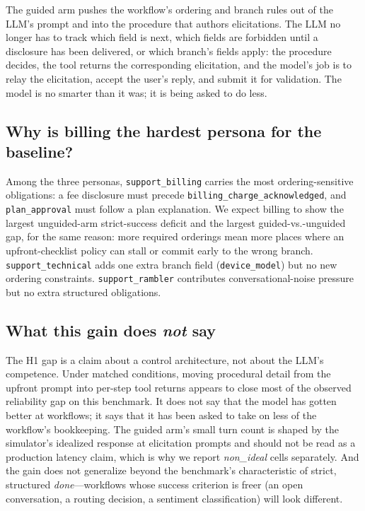 \documentclass[11pt,a4paper]{article}
\begin{document}
The guided arm pushes the workflow's ordering and branch rules out of the LLM's prompt and into the procedure that authors elicitations. The LLM no longer has to track which field is next, which fields are forbidden until a disclosure has been delivered, or which branch's fields apply: the procedure decides, the tool returns the corresponding elicitation, and the model's job is to relay the elicitation, accept the user's reply, and submit it for validation. The model is no smarter than it was; it is being asked to do less.

\subsection{Why is billing the hardest persona for the baseline?}

Among the three personas, \texttt{support\_billing} carries the most ordering-sensitive obligations: a fee disclosure must precede \texttt{billing\_charge\_acknowledged}, and \texttt{plan\_approval} must follow a plan explanation. We expect billing to show the largest unguided-arm strict-success deficit and the largest guided-vs.-unguided gap, for the same reason: more required orderings mean more places where an upfront-checklist policy can stall or commit early to the wrong branch. \texttt{support\_technical} adds one extra branch field (\texttt{device\_model}) but no new ordering constraints. \texttt{support\_rambler} contributes conversational-noise pressure but no extra structured obligations.

\subsection{What this gain does \emph{not} say}

The H1 gap is a claim about a control architecture, not about the LLM's competence. Under matched conditions, moving procedural detail from the upfront prompt into per-step tool returns appears to close most of the observed reliability gap on this benchmark. It does not say that the model has gotten better at workflows; it says that it has been asked to take on less of the workflow's bookkeeping. The guided arm's small turn count is shaped by the simulator's idealized response at elicitation prompts and should not be read as a production latency claim, which is why we report \emph{non\_ideal} cells separately. And the gain does not generalize beyond the benchmark's characteristic of strict, structured \emph{done}---workflows whose success criterion is freer (an open conversation, a routing decision, a sentiment classification) will look different.
\end{document}
